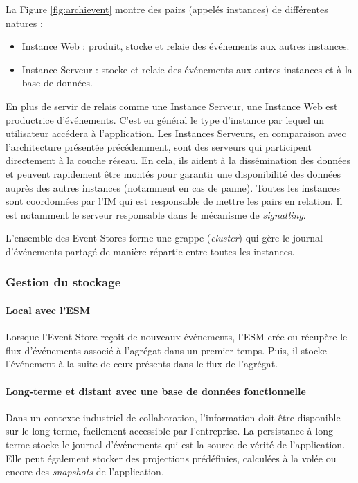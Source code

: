 La Figure \ref{fig:archievent} montre des pairs (appelés instances) de différentes 
natures :
\begin{itemize}
	\item Instance Web :  produit, stocke et relaie des événements aux autres 
	instances.
	\item Instance Serveur : stocke et relaie des événements aux autres instances 
	et à la base de données. 
\end{itemize}

En plus de servir de relais comme une Instance Serveur, une Instance Web est 
productrice d'événements. C'est en général le type d'instance par lequel un 
utilisateur accédera à l'application. Les Instances Serveurs, en comparaison avec 
l'architecture présentée précédemment, sont des \og serveurs\fg{} qui participent 
directement à la couche réseau. En cela, ils aident à la dissémination des données 
et peuvent rapidement être montés pour garantir une disponibilité des données 
auprès des autres instances (notamment en cas de panne).
Toutes les instances sont coordonnées par l'\gls{IM} qui est responsable de mettre 
les pairs en relation. Il est notamment le serveur responsable dans le mécanisme 
de \textit{signalling}. 

L'ensemble des Event Stores forme une grappe (\textit{cluster}) qui gère le 
journal d'événements partagé de manière répartie entre toutes les instances.
\subsubsection{Gestion du stockage}
\paragraph{Local avec l'\gls{ESM}}
Lorsque l'Event Store reçoit de nouveaux événements, l'\gls{ESM} crée ou 
récupère le flux d'événements associé à l'agrégat dans un premier temps. Puis, il 
stocke l'événement à la suite de ceux présents dans le flux de l'agrégat.

\paragraph{Long-terme et distant avec une base de données fonctionnelle}
Dans un contexte industriel de collaboration, l'information doit être disponible sur le 
long-terme, facilement accessible par l'entreprise. La persistance à 
long-terme stocke le journal d'événements qui est la 
source de vérité de l'application. Elle peut également stocker des projections 
prédéfinies, calculées à la volée ou encore des \textit{snapshots} de l'application.

